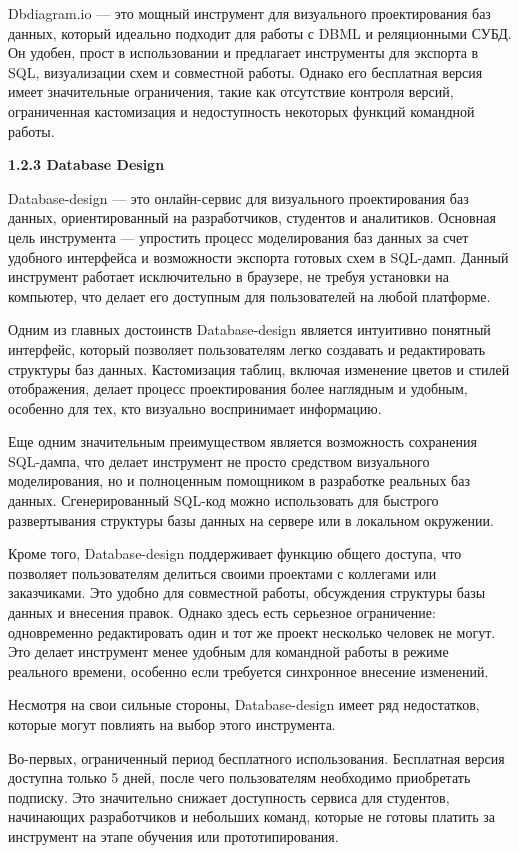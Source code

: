 Dbdiagram.io — это мощный инструмент для визуального проектирования баз данных, который идеально подходит для работы с DBML и реляционными СУБД. Он удобен, прост в использовании и предлагает инструменты для экспорта в SQL, визуализации схем и совместной работы. Однако его бесплатная версия имеет значительные ограничения, такие как отсутствие контроля версий, ограниченная кастомизация и недоступность некоторых функций командной работы.

\textbf{1.2.3 Database Design}

Database-design — это онлайн-сервис для визуального проектирования баз данных, ориентированный на разработчиков, студентов и аналитиков. Основная цель инструмента — упростить процесс моделирования баз данных за счет удобного интерфейса и возможности экспорта готовых схем в SQL-дамп. Данный инструмент работает исключительно в браузере, не требуя установки на компьютер, что делает его доступным для пользователей на любой платформе.


Одним из главных достоинств Database-design является интуитивно понятный интерфейс, который позволяет пользователям легко создавать и редактировать структуры баз данных. Кастомизация таблиц, включая изменение цветов и стилей отображения, делает процесс проектирования более наглядным и удобным, особенно для тех, кто визуально воспринимает информацию.

Еще одним значительным преимуществом является возможность сохранения SQL-дампа, что делает инструмент не просто средством визуального моделирования, но и полноценным помощником в разработке реальных баз данных. Сгенерированный SQL-код можно использовать для быстрого развертывания структуры базы данных на сервере или в локальном окружении.

Кроме того, Database-design поддерживает функцию общего доступа, что позволяет пользователям делиться своими проектами с коллегами или заказчиками. Это удобно для совместной работы, обсуждения структуры базы данных и внесения правок. Однако здесь есть серьезное ограничение: одновременно редактировать один и тот же проект несколько человек не могут. Это делает инструмент менее удобным для командной работы в режиме реального времени, особенно если требуется синхронное внесение изменений.

Несмотря на свои сильные стороны, Database-design имеет ряд недостатков, которые могут повлиять на выбор этого инструмента.

Во-первых, ограниченный период бесплатного использования. Бесплатная версия доступна только 5 дней, после чего пользователям необходимо приобретать подписку. Это значительно снижает доступность сервиса для студентов, начинающих разработчиков и небольших команд, которые не готовы платить за инструмент на этапе обучения или прототипирования.

